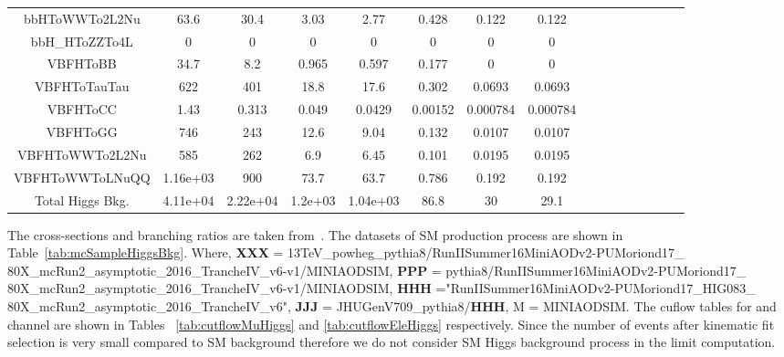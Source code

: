 \begin{table}
\begin{adjustbox}{max width=\textwidth}
\begin{tabular}{  c c c c c c c c c c c c cccc}
bbHToWWTo2L2Nu & 63.6 & 30.4 & 3.03 & 2.77 & 0.428 & 0.122 & 0.122 \\ 
bbH\_HToZZTo4L & 0 & 0 & 0 & 0 & 0 & 0 & 0 \\ 
\hline 
VBFHToBB & 34.7 & 8.2 & 0.965 & 0.597 & 0.177 & 0 & 0 \\ 
VBFHToTauTau & 622 & 401 & 18.8 & 17.6 & 0.302 & 0.0693 & 0.0693 \\ 
VBFHToCC & 1.43 & 0.313 & 0.049 & 0.0429 & 0.00152 & 0.000784 & 0.000784 \\ 
VBFHToGG & 746 & 243 & 12.6 & 9.04 & 0.132 & 0.0107 & 0.0107 \\ 
VBFHToWWTo2L2Nu & 585 & 262 & 6.9 & 6.45 & 0.101 & 0.0195 & 0.0195 \\ 
VBFHToWWToLNuQQ & 1.16e+03 & 900 & 73.7 & 63.7 & 0.786 & 0.192 & 0.192 \\ 
\hline 
Total Higgs Bkg. & 4.11e+04 & 2.22e+04 & 1.2e+03 & 1.04e+03 & 86.8 & 30 & 29.1 \\ 
\hline 
\end{tabular}
\end{adjustbox}
\end{table}

The cross-sections and branching ratios are taken from~\cite{HiggsXSS}. 
The datasets of SM production process are shown in Table~\ref{tab:mcSampleHiggsBkg}. 
Where, {\bf{XXX}} = 13TeV\_powheg\_pythia8/RunIISummer16MiniAODv2-PUMoriond17\_ \newline 80X\_mcRun2\_asymptotic\_2016\_TrancheIV\_v6-v1/MINIAODSIM, \newline
{\bf{PPP}} = pythia8/RunIISummer16MiniAODv2-PUMoriond17\_\newline
80X\_mcRun2\_asymptotic\_2016\_TrancheIV\_v6-v1/MINIAODSIM,\newline
{\bf{HHH}} ="RunIISummer16MiniAODv2-PUMoriond17\_HIG083\_ \newline
80X\_mcRun2\_asymptotic\_2016\_TrancheIV\_v6",\newline
{\bf{JJJ}} = JHUGenV709\_pythia8/{\bf{HHH}}, M = MINIAODSIM. The cuflow tables 
for \mujets and \ejets channel are shown in
Tables ~\ref{tab:cutflowMuHiggs} and \ref{tab:cutflowEleHiggs} respectively. Since the 
number of events after kinematic fit selection is very small compared to SM \ttjets
background therefore we do not consider SM Higgs background process in the limit computation.
